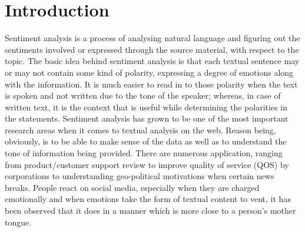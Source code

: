 \documentclass[12pt]{article}
\begin{document}
\section{Introduction}

\fontsize{12}{20}\selectfont Sentiment analysis is a process of analysing natural language and figuring out
the sentiments involved or expressed through the source material, with respect
to the topic. The basic idea behind sentiment analysis is that each textual
sentence may or may not contain some kind of polarity, expressing a degree of
emotions along with the information. It is much easier to read in to those
polarity when the text is spoken and not written due to the tone of the
speaker; whereas, in case of written text, it is the context that is useful
while determining the polarities in the statements. Sentiment analysis has
grown to be one of the most important research areas when it comes to textual
analysis on the web. Reason being, obviously, is to be able to make sense of
the data as well as to understand the tone of information being provided. There
are numerous application, ranging from product/customer support review to
improve quality of service (QOS) by corporations to understanding geo-political
motivations when certain news breaks. People react on social media, especially
when they are charged emotionally and when emotions take the form of textual
content to vent, it has been observed that it does in a manner which is more
close to a person's mother tongue.\\
\end{document}
